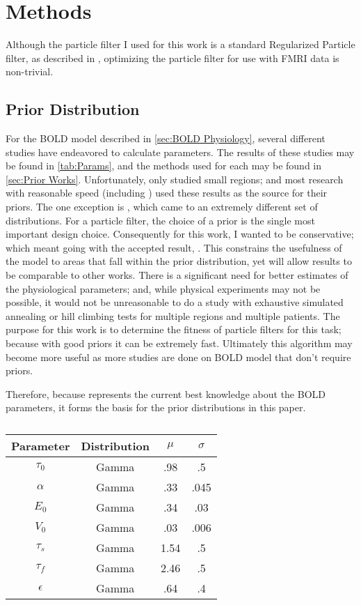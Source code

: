 \chapter{Methods}
Although the particle filter I used for this work is a standard Regularized
Particle filter, as described in \cite{Arulampalam2002a}, optimizing the 
particle filter for use with FMRI data is non-trivial. 

\section{Prior Distribution}
For the BOLD model described in \autoref{sec:BOLD Physiology}, several
different studies have endeavored to calculate parameters. The results
of these studies may be found in \autoref{tab:Params}, and the methods 
used for each may be found in \autoref{sec:Prior Works}. Unfortunately,
\cite{Friston2000} only studied small regions; and most research with
reasonable speed (including \cite{Friston2002b}) used these results as 
the source for their priors. 
The one exception is \cite{Johnston2008}, which came to an extremely different
set of distributions. For a particle filter, the choice of a prior is
the single most important design choice. Consequently for this work,
I wanted to be conservative; which meant going with the accepted result,
\cite{Friston2000}. This constrains the usefulness of the model to
areas that fall within the prior distribution, yet will allow results
to be comparable to other works. There is a significant need for better
estimates of the physiological parameters; and, while physical experiments
may not be possible, it would not be unreasonable to do a study with
exhaustive simulated annealing or hill climbing tests for multiple
regions and multiple patients. The purpose for this work is to determine
the fitness of particle filters for this task; because with good 
priors it can be extremely fast. Ultimately this algorithm may become
more useful as more studies are done on BOLD model that don't require
priors. 

Therefore, because \cite{Friston2000} represents the current best
knowledge about the BOLD parameters, it forms the basis
for the prior distributions in this paper. 

\begin{table}[t]
\centering
\begin{tabular}{|c || c | c | c |}
\hline 
Parameter & Distribution & $\mu$ & $\sigma$ \\
\hline
$\tau_0$ & Gamma & .98 & .5  \\
$\alpha$ & Gamma & .33 & .045\\
$E_0$    & Gamma & .34 & .03  \\
$V_0$    & Gamma & .03 & .006 \\
$\tau_s$ & Gamma & 1.54  & .5 \\
$\tau_f$ & Gamma & 2.46  & .5 \\
$\epsilon$ & Gamma & .64 & .4 \\
\hline
\end{tabular}
\caption{}
\label{tab:Prior} 
\end{table}

